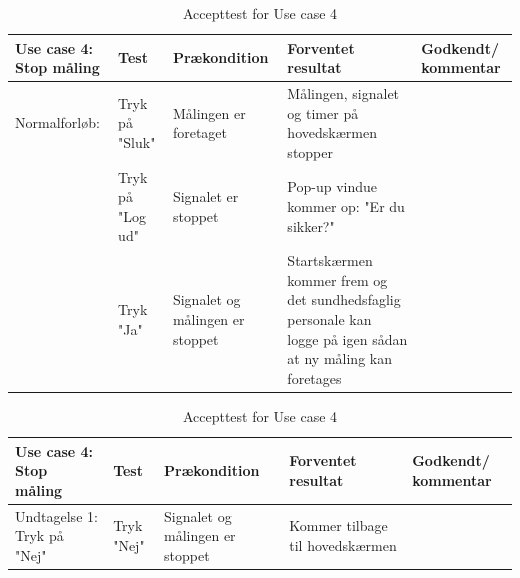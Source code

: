 \begin{table}[H]
\caption{Accepttest for Use case 4}\label{tab:tabel16}
\begin{tabular}{|>{\raggedright\arraybackslash}p{2.5cm}| >{\raggedright\arraybackslash}p{2.9cm} | >{\raggedright\arraybackslash}p{2.9cm} | >{\raggedright\arraybackslash}p{2.9cm} | >{\raggedright\arraybackslash}p{2.8cm} |}
   \hline
   \textbf{Use case 4: Stop måling } &\textbf{Test}& \textbf{Prækondition} & \textbf{Forventet resultat} & \textbf{Godkendt/ kommentar}\\ \hline
   Normalforløb:& Tryk på "Sluk" & Målingen er foretaget & Målingen, signalet og timer på hovedskærmen stopper &\\\hline
   & Tryk på "Log ud" & Signalet er stoppet & Pop-up vindue kommer op: "Er du sikker?" &\\\hline
   &Tryk "Ja"&Signalet og målingen er stoppet& Startskærmen kommer frem og det sundhedsfaglig personale kan logge på igen sådan at ny måling kan foretages &\\\hline
\end{tabular}
\end{table}

\begin{table}[H]
\caption{Accepttest for Use case 4}\label{tab:tabel17}
\begin{tabular}{|>{\raggedright\arraybackslash}p{2.5cm}| >{\raggedright\arraybackslash}p{2.9cm} | >{\raggedright\arraybackslash}p{2.9cm} | >{\raggedright\arraybackslash}p{2.9cm} | >{\raggedright\arraybackslash}p{2.8cm} |}
   \hline
   \textbf{Use case 4: Stop måling } &\textbf{Test}& \textbf{Prækondition} & \textbf{Forventet resultat} & \textbf{Godkendt/ kommentar}\\ \hline
Undtagelse 1: Tryk på "Nej" &Tryk "Nej" & Signalet og målingen er stoppet & Kommer tilbage til hovedskærmen &\\\hline
\end{tabular}
\end{table}
\newpage
\newpage
\newpage
